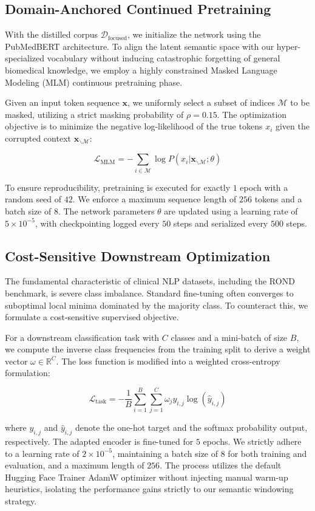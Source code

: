 \documentclass[a4paper,fleqn]{cas-dc}
\begin{document}
\subsection{Domain-Anchored Continued Pretraining}
With the distilled corpus $\mathcal{D}_{\text{focused}}$, we initialize the network using the PubMedBERT architecture. To align the latent semantic space with our hyper-specialized vocabulary without inducing catastrophic forgetting of general biomedical knowledge, we employ a highly constrained Masked Language Modeling (MLM) continuous pretraining phase.

Given an input token sequence $\mathbf{x}$, we uniformly select a subset of indices $\mathcal{M}$ to be masked, utilizing a strict masking probability of $\rho = 0.15$. The optimization objective is to minimize the negative log-likelihood of the true tokens $x_i$ given the corrupted context $\mathbf{x}_{\backslash \mathcal{M}}$:

$$\mathcal{L}_{\text{MLM}} = - \sum_{i \in \mathcal{M}} \log P(x_i | \mathbf{x}_{\backslash \mathcal{M}}; \theta)$$

To ensure reproducibility, pretraining is executed for exactly $1$ epoch with a random seed of $42$. We enforce a maximum sequence length of $256$ tokens and a batch size of $8$. The network parameters $\theta$ are updated using a learning rate of $5 \times 10^{-5}$, with checkpointing logged every $50$ steps and serialized every $500$ steps.

\subsection{Cost-Sensitive Downstream Optimization}
The fundamental characteristic of clinical NLP datasets, including the ROND benchmark, is severe class imbalance. Standard fine-tuning often converges to suboptimal local minima dominated by the majority class. To counteract this, we formulate a cost-sensitive supervised objective.

For a downstream classification task with $C$ classes and a mini-batch of size $B$, we compute the inverse class frequencies from the training split to derive a weight vector $\omega \in \mathbb{R}^C$. The loss function is modified into a weighted cross-entropy formulation:

$$\mathcal{L}_{\text{task}} = - \frac{1}{B} \sum_{i=1}^{B} \sum_{j=1}^{C} \omega_j y_{i,j} \log(\hat{y}_{i,j})$$

where $y_{i,j}$ and $\hat{y}_{i,j}$ denote the one-hot target and the softmax probability output, respectively. The adapted encoder is fine-tuned for $5$ epochs. We strictly adhere to a learning rate of $2 \times 10^{-5}$, maintaining a batch size of $8$ for both training and evaluation, and a maximum length of $256$. The process utilizes the default Hugging Face Trainer AdamW optimizer without injecting manual warm-up heuristics, isolating the performance gains strictly to our semantic windowing strategy.
\end{document}
